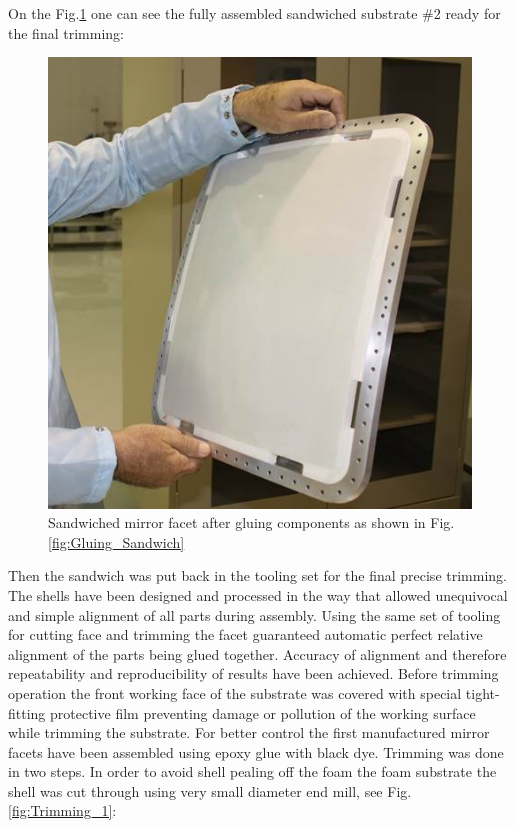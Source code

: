 On the Fig.\ref{fig:Assembled_Sandwich} one can see the fully assembled sandwiched substrate \#2 ready for the final trimming: 

\begin{figure}[h]
    \centering
    \includegraphics[width=0.9\linewidth]{images/Assembled_Sandwich.jpg}
    \caption{Sandwiched mirror facet after gluing components as shown in Fig.\ref{fig:Gluing_Sandwich}}
    \label{fig:Assembled_Sandwich}
\end{figure}

Then the sandwich was put back in the tooling set for the final precise trimming. The shells have been designed and processed in the way that allowed  unequivocal and simple alignment of all parts during assembly. Using the same set of tooling for cutting face and trimming the facet guaranteed automatic perfect relative alignment of the parts being glued together. Accuracy of alignment and therefore repeatability and reproducibility of results have been achieved. Before trimming operation the front working face of the substrate was covered with special tight-fitting protective film preventing damage or pollution of the working surface while trimming the substrate. For better control the first manufactured mirror facets have been assembled using epoxy glue with black dye. Trimming was done in two steps. In order to avoid shell pealing off the foam the foam substrate the shell was cut through using very small diameter end mill, see Fig.\ref{fig:Trimming_1}:

